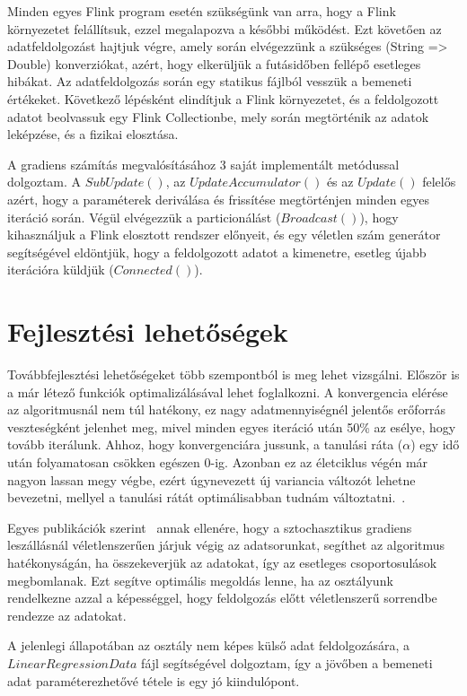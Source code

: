 \documentclass[a4paper,12pt]{article}
\begin{document}
Minden egyes Flink program esetén szükségünk van arra, hogy a Flink környezetet felállítsuk, ezzel megalapozva a későbbi működést. Ezt követően az adatfeldolgozást hajtjuk végre, amely során elvégezzünk a szükséges (String => Double) konverziókat, azért, hogy elkerüljük a futásidőben fellépő esetleges hibákat. Az adatfeldolgozás során egy statikus fájlból vesszük a bemeneti értékeket. Következő lépésként elindítjuk a Flink környezetet, és a feldolgozott adatot beolvassuk egy Flink Collectionbe, mely során megtörténik az adatok leképzése, és a fizikai elosztása. \newline

A gradiens számítás megvalósításához 3 saját implementált metódussal dolgoztam. A $SubUpdate()$, az $UpdateAccumulator()$ és az $Update()$ felelős azért, hogy a paraméterek deriválása és frissítése megtörténjen minden egyes iteráció során. 
Végül elvégezzük a particionálást ($Broadcast()$), hogy kihasználjuk a Flink elosztott rendszer előnyeit, és egy véletlen szám generátor segítségével eldöntjük, hogy a feldolgozott adatot a kimenetre, esetleg újabb iterációra küldjük ($Connected()$).

\newpage
\section{Fejlesztési lehetőségek}	
Továbbfejlesztési lehetőségeket több szempontból is meg lehet vizsgálni. Először is a már létező funkciók optimalizálásával lehet foglalkozni. A konvergencia elérése az algoritmusnál nem túl hatékony, ez nagy adatmennyiségnél jelentős erőforrás veszteségként jelenhet meg, mivel minden egyes iteráció után 50\% az esélye, hogy tovább iterálunk.
Ahhoz, hogy konvergenciára jussunk, a tanulási ráta ($\alpha$) egy idő után folyamatosan csökken egészen 0-ig. Azonban ez az életciklus végén már nagyon lassan megy végbe, ezért úgynevezett új variancia változót lehetne bevezetni, mellyel a tanulási rátát optimálisabban tudnám változtatni.~\parencite{svrg}.

Egyes publikációk szerint~\parencite{sgd} annak ellenére, hogy a sztochasztikus gradiens leszállásnál véletlenszerűen járjuk végig az adatsorunkat, segíthet az algoritmus hatékonyságán, ha összekeverjük az adatokat, így az esetleges csoportosulások megbomlanak. Ezt segítve optimális megoldás lenne, ha az osztályunk rendelkezne azzal a képességgel, hogy feldolgozás előtt véletlenszerű sorrendbe rendezze az adatokat.

A jelenlegi állapotában az osztály nem képes külső adat feldolgozására, a $LinearRegressionData$ fájl segítségével dolgoztam, így a jövőben a bemeneti adat paraméterezhetővé tétele is egy jó kiindulópont.
\end{document}
